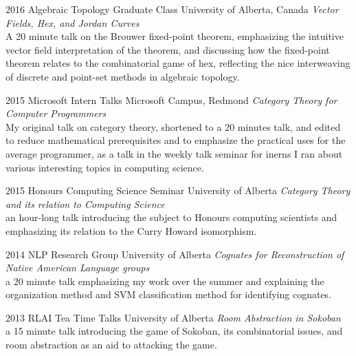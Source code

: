 \documentclass{friggeri-cv} %
\begin{document}
\begin{entrylist}

\entry
{2016}
{Algebraic Topology Graduate Class}
{University of Alberta, Canada}
{\emph{Vector Fields, Hex, and Jordan Curves}\\
A 20 minute talk on the Brouwer fixed-point theorem, emphasizing the intuitive vector field interpretation of the theorem, and discussing how the fixed-point theorem relates to the combinatorial game of hex, reflecting the nice interweaving of discrete and point-set methods in algebraic topology.}

\end{entrylist}


\begin{entrylist}

    
\entry
{2015}
{Microsoft Intern Talks}
{Microsoft Campus, Redmond}
{\emph{Category Theory for Computer Programmers}\\
My original talk on category theory, shortened to a 20 minutes talk, and edited to reduce mathematical prerequisites and to emphasize the practical uses for the average programmer, as a talk in the weekly talk seminar for inerns I ran about various interesting topics in computing science.}


\entry
{2015}
{Honours Computing Science Seminar}
{University of Alberta}
{\emph{Category Theory and its relation to Computing Science}\\
an hour-long talk introducing the subject to Honours computing scientists and emphasizing its relation to the Curry Howard isomorphism.}


\entry
{2014}
{NLP Research Group}
{University of Alberta}
{\emph{Cognates for Reconstruction of Native American Language groups}\\
a 20 minute talk emphasizing my work over the summer and explaining the organization method and SVM classification method for identifying cognates.}


\entry
{2013}
{RLAI Tea Time Talks}
{University of Alberta}
{\emph{Room Abstraction in Sokoban}\\
a 15 minute talk introducing the game of Sokoban, its combinatorial issues, and room abstraction as an aid to attacking the game.}

\end{entrylist}
\end{document}
